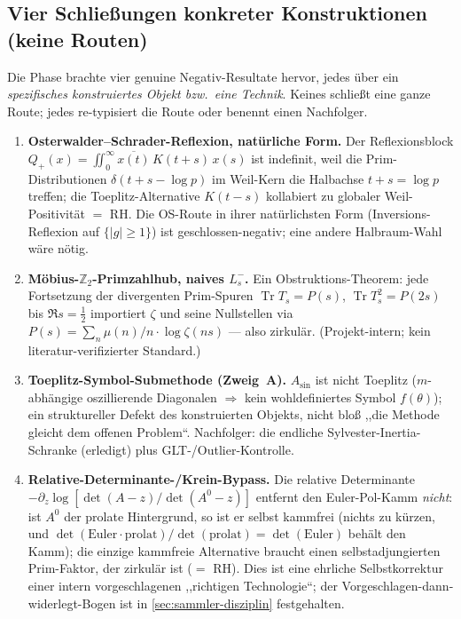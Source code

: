 \documentclass[12pt,a4paper]{article}
\theoremstyle{definition}
\theoremstyle{remark}
\begin{document}
\subsection{Vier Schließungen konkreter Konstruktionen (keine Routen)}
\label{sec:four-closures}

Die Phase brachte vier genuine Negativ-Resultate hervor, jedes über ein
\emph{spezifisches konstruiertes Objekt bzw.\ eine Technik}. Keines schließt eine
ganze Route; jedes re-typisiert die Route oder benennt einen Nachfolger.

\begin{enumerate}
  \item \textbf{Osterwalder--Schrader-Reflexion, natürliche Form.} Der
    Reflexionsblock $Q_+(x)=\iint_0^\infty \overline{x(t)}\,K(t+s)\,x(s)$ ist
    indefinit, weil die Prim-Distributionen $\delta(t+s-\log p)$ im Weil-Kern die
    Halbachse $t+s=\log p$ treffen; die Toeplitz-Alternative $K(t-s)$ kollabiert zu
    globaler Weil-Positivität $=$ RH. Die OS-Route in ihrer natürlichsten Form
    (Inversions-Reflexion auf $\{|g|\ge 1\}$) ist geschlossen-negativ; eine andere
    Halbraum-Wahl wäre nötig.
  \item \textbf{Möbius-$\mathbb{Z}_2$-Primzahlhub, naives $L_s^-$.} Ein
    Obstruktions-Theorem: jede Fortsetzung der divergenten Prim-Spuren
    $\operatorname{Tr}T_s=P(s)$, $\operatorname{Tr}T_s^2=P(2s)$ bis $\Re s=\tfrac12$
    importiert $\zeta$ und seine Nullstellen via
    $P(s)=\sum_n \mu(n)/n\cdot\log\zeta(ns)$ --- also zirkulär. (Projekt-intern;
    kein literatur-verifizierter Standard.)
  \item \textbf{Toeplitz-Symbol-Submethode (Zweig~A).} $A_{\sin}$ ist nicht Toeplitz
    ($m$-abhängige oszillierende Diagonalen $\Rightarrow$ kein wohldefiniertes Symbol
    $f(\theta)$); ein struktureller Defekt des konstruierten Objekts, nicht bloß
    ,,die Methode gleicht dem offenen Problem``. Nachfolger: die endliche
    Sylvester-Inertia-Schranke (erledigt) plus GLT-/Outlier-Kontrolle.
  \item \textbf{Relative-Determinante-/Krein-Bypass.} Die relative Determinante
    $-\partial_z\log[\det(A-z)/\det(A^0-z)]$ entfernt den Euler-Pol-Kamm \emph{nicht}:
    ist $A^0$ der prolate Hintergrund, so ist er selbst kammfrei (nichts zu kürzen,
    und $\det(\text{Euler}\cdot\text{prolat})/\det(\text{prolat})=\det(\text{Euler})$
    behält den Kamm); die einzige kammfreie Alternative braucht einen
    selbstadjungierten Prim-Faktor, der zirkulär ist ($=$ RH). Dies ist eine ehrliche
    Selbstkorrektur einer intern vorgeschlagenen ,,richtigen Technologie``; der
    Vorgeschlagen-dann-widerlegt-Bogen ist in \cref{sec:sammler-disziplin}
    festgehalten.
\end{enumerate}
\end{document}
